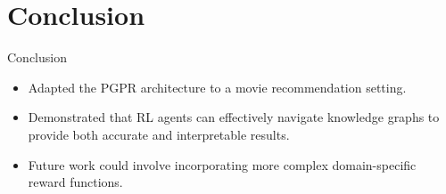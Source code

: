 \documentclass[10pt]{beamer}
\begin{document}
\section{Conclusion}

\begin{frame}{Conclusion}
    \begin{itemize}
        \item Adapted the PGPR architecture to a movie recommendation setting.
        \item Demonstrated that RL agents can effectively navigate knowledge graphs to provide both accurate and interpretable results.
        \item Future work could involve incorporating more complex domain-specific reward functions.
    \end{itemize}
\end{frame}
\end{document}
